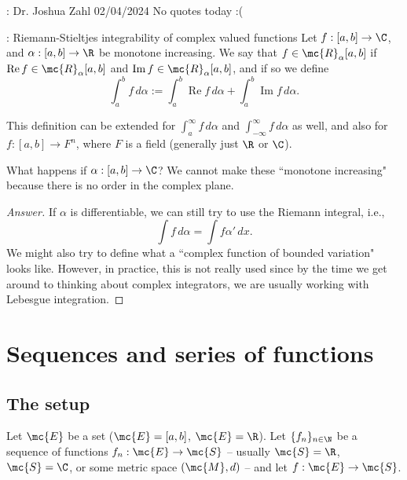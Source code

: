 \begin{nquote}{: Dr. Joshua Zahl 02/04/2024}
	No quotes today :(
\end{nquote}

\begin{ndef}{: Riemann-Stieltjes integrability of complex valued functions}
	Let \(f:[a,b]\to\C\), and \(\alpha:[a,b]\to\R\) be monotone increasing. We say that \(f\in\mc{R}_{\alpha}[a,b]\) if \(\operatorname{Re}f\in\mc{R}_{\alpha}[a,b]\) and \(\operatorname{Im}f\in\mc{R}_{\alpha}[a,b]\), and if so we define
	\begin{equation*}
		\int_a^b f \, d\alpha:=\int_a^b \operatorname{Re}f \, d\alpha+\int_a^b \operatorname{Im}f \, d\alpha.
	\end{equation*}
\end{ndef}
This definition can be extended for \(\int_a^{\infty} f \, d\alpha\) and \(\int_{-\infty}^{\infty} f \, d\alpha\) as well, and also for \(f:[a,b]\to F^n\), where \(F\) is a field (generally just \(\R\) or \(\C\)).

\begin{fft}
	What happens if \(\alpha:[a,b]\to\C\)? We cannot make these ``monotone increasing" because there is no order in the complex plane.
\end{fft}
\begin{proof}[Answer]\let\qed\relax
	If \(\alpha\) is differentiable, we can still try to use the Riemann integral, i.e., 
	\begin{equation*}
		\int f \, d\alpha=\int f\alpha' \, dx.
	\end{equation*}
	We might also try to define what a ``complex function of bounded variation" looks like. However, in practice, this is not really used since by the time we get around to thinking about complex integrators, we are usually working with Lebesgue integration.
\end{proof}

\section{Sequences and series of functions}
\subsection{The setup}
Let \(\mc{E}\) be a set (\(\mc{E}=[a,b]\), \(\mc{E}=\R\)). Let \(\{f_n\}_{n\in\N}\) be a sequence of functions \(f_n:\mc{E}\to\mc{S}\) -- usually \(\mc{S}=\R\), \(\mc{S}=\C\), or some metric space \((\mc{M},d)\) -- and let \(f:\mc{E}\to\mc{S}\). 

